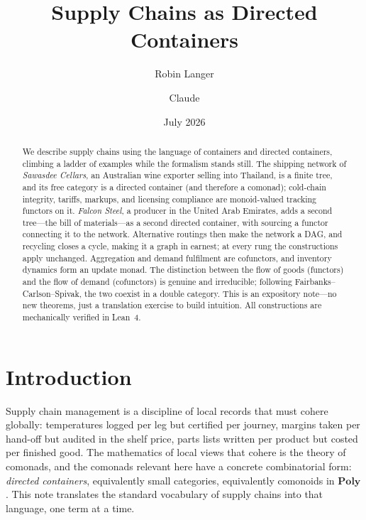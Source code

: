 \documentclass[11pt,a4paper]{article}
\title{\textbf{Supply Chains as Directed Containers}}
\author{Robin Langer \and Claude}
\date{July 2026}
\newcommand{\Poly}{\mathbf{Poly}}
\theoremstyle{plain}
\theoremstyle{definition}
\theoremstyle{remark}
\begin{document}
\maketitle

\begin{abstract}
We describe supply chains using the language of containers and directed
containers, climbing a ladder of examples while the formalism stands
still. The shipping network of \emph{Sawasdee Cellars}, an Australian
wine exporter selling into Thailand, is a finite tree, and its free
category is a directed container (and therefore a comonad);
cold-chain integrity, tariffs, markups, and licensing compliance are
monoid-valued tracking functors on it. \emph{Falcon Steel}, a
producer in the United
Arab Emirates, adds a second tree---the bill of materials---as a
second directed container, with sourcing a functor connecting it to
the network. Alternative routings then make the network a DAG, and
recycling closes a cycle, making it a graph in earnest; at every rung
the constructions apply unchanged. Aggregation and demand fulfilment
are cofunctors, and inventory dynamics form an update monad. The
distinction between the flow of goods (functors) and the flow of
demand (cofunctors) is genuine and irreducible; following
Fairbanks--Carlson--Spivak, the two coexist in a double category. This
is an expository note---no new theorems, just a translation exercise to
build intuition. All constructions are mechanically verified in
Lean~4.
\end{abstract}

\section{Introduction}

Supply chain management is a discipline of local records that must
cohere globally: temperatures logged per leg but certified per
journey, margins taken per hand-off but audited in the shelf price,
parts lists written per product but costed per finished good. The
mathematics of local views that cohere is the theory of comonads,
and the comonads relevant here have a concrete combinatorial form:
\emph{directed containers}, equivalently small categories,
equivalently comonoids in $\Poly$. This note translates the standard
vocabulary of supply chains into that language, one term at a time.
\end{document}
